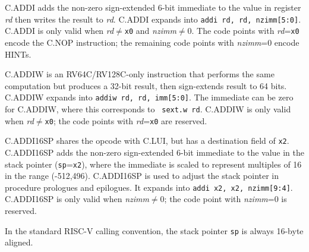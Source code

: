 C.ADDI adds the non-zero sign-extended 6-bit immediate to the value in
register {\em rd} then writes the result to {\em rd}.  C.ADDI expands
into {\tt addi rd, rd, nzimm[5:0]}.
C.ADDI is only valid when {\em rd}$\neq${\tt x0} and {\em nzimm}$\neq$0.
The code points with {\em rd}={\tt x0} encode the C.NOP instruction;
the remaining code points with {\em nzimm}=0 encode HINTs.

C.ADDIW is an RV64C/RV128C-only instruction that performs the same
computation but produces a 32-bit result, then sign-extends result to
64 bits.  C.ADDIW expands into {\tt addiw rd, rd, imm[5:0]}.  The
immediate can be zero for C.ADDIW, where this corresponds to {\tt
sext.w rd}.  C.ADDIW is only valid when {\em rd}$\neq${\tt x0};
the code points with {\em rd}={\tt x0} are reserved.

C.ADDI16SP shares the opcode with C.LUI, but has a destination field
of {\tt x2}. C.ADDI16SP adds the non-zero sign-extended 6-bit immediate to
the value in the stack pointer ({\tt sp}={\tt x2}), where the
immediate is scaled to represent multiples of 16 in the range
(-512,496). C.ADDI16SP is used to adjust the stack pointer in procedure
prologues and epilogues.  It expands into {\tt addi x2, x2, nzimm[9:4]}.
C.ADDI16SP is only valid when {\em nzimm}$\neq$0;
the code point with {\em nzimm}=0 is reserved.

\begin{commentary}
In the standard RISC-V calling convention, the stack pointer {\tt sp}
is always 16-byte aligned.
\end{commentary}

